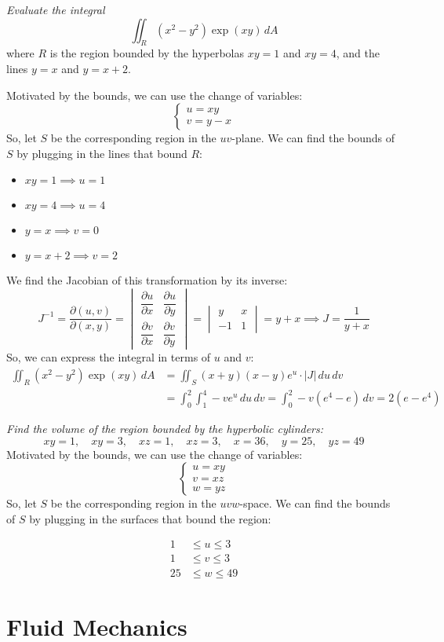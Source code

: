 \documentclass[11pt]{report}
\begin{document}
\begin{example}
    \textit{Evaluate the integral}
    $$
        \iint_R (x^2 - y^2) \exp(xy) \, dA
    $$
    where $R$ is the region bounded by the hyperbolas $xy=1$ and $xy=4$, and the lines $y=x$ and $y=x+2$.

    Motivated by the bounds, we can use the change of variables:
    $$
    \begin{cases}
        u = xy \\
        v = y - x
    \end{cases}
    $$
    So, let $S$ be the corresponding region in the $uv$-plane. We can find the bounds of $S$ by plugging in the lines that bound $R$:   
    \begin{itemize}
        \item $xy = 1 \implies u = 1$
        \item $xy = 4 \implies u = 4$
        \item $y = x \implies v = 0$
        \item $y = x + 2 \implies v = 2$
    \end{itemize}
    We find the Jacobian of this transformation by its inverse:
    $$
    J^{-1} = \frac{\partial(u,v)}{\partial(x,y)} = \begin{vmatrix}
        \dfrac{\partial u}{\partial x} & \dfrac{\partial u}{\partial y} \\
        \dfrac{\partial v}{\partial x} & \dfrac{\partial v}{\partial y}
    \end{vmatrix} = \begin{vmatrix}
        y & x \\
        -1 & 1
    \end{vmatrix} = y + x \implies J = \frac{1}{y + x}
    $$
    So, we can express the integral in terms of $u$ and $v$:
    \begin{align*}
        \iint_R (x^2 - y^2) \exp(xy) \, dA &= \iint_S (x+y)(x-y)e^u \cdot |J| \, du \, dv \\
        &= \int_0^2 \int_1^4 -v e^u \, du \, dv = \int_0^2 -v(e^4 - e) \, dv = 2(e - e^4)
    \end{align*}
\end{example}
\begin{example}
    \textit{Find the volume of the region bounded by the hyperbolic cylinders:}
    $$ 
    xy = 1, \quad xy = 3, \quad xz = 1, \quad xz = 3, \quad x = 36, \quad y = 25, \quad yz = 49
    $$
    Motivated by the bounds, we can use the change of variables:
    $$
    \begin{cases}
        u = xy \\
        v = xz \\
        w = yz
    \end{cases} 
    $$
    So, let $S$ be the corresponding region in the $uvw$-space. We can find the bounds of $S$ by plugging in the surfaces that bound the region:

    \begin{align*}
        1 &\leq u \leq 3 \\
        1 &\leq v \leq 3 \\
        25 &\leq w \leq 49
    \end{align*}

\end{example}
\chapter{Fluid Mechanics}
\end{document}
